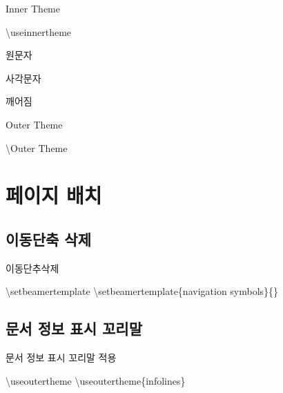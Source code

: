 \documentclass[10pt,blue,xcolor=pdftex,dvipsnames,table,handout]{beamer}
\begin{document}
		\begin{frame}[t,shrink=10]{Inner Theme}

			\begin{block} {\textbackslash useinnertheme}
			\begin{description}[12345678901234]
			\item [default]
			\item [circles]	 원문자			
			\item [rectangles]	 사각문자			
			\item [rounded]	 깨어짐
			\item [inmargin]		
			\end{description}
			\end{block}
		\end{frame}


		\begin{frame}[t]{Outer Theme}

			\begin{block} {\textbackslash Outer Theme}
			\end{block}
		\end{frame}



		\section{페이지 배치}

		\subsection{이동단축 삭제}
		\begin{frame}{이동단추삭제}

			\begin{block} {\textbackslash setbeamertemplate}
			\textbackslash setbeamertemplate\{navigation symbols\}\{\}
			\end{block}
		\end{frame}



		\subsection{문서 정보 표시 꼬리말}
		\begin{frame}{문서 정보 표시 꼬리말 적용}

			\begin{block} {\textbackslash useoutertheme}
			\textbackslash useoutertheme\{infolines\}
			\end{block}
		\end{frame}
\end{document}
